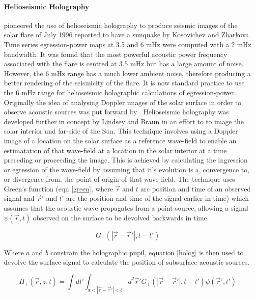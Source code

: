 \paragraph{Helioseismic Holography}\label{helioholog}
\cite{1999ApJ...513L.143D} pioneered the use of helioseismic holography to produce seismic images of the solar flare of July 1996 reported to have a sunquake by Kosovichev and Zharkova. Time series egression-power maps at 3.5 and 6 mHz were computed with a 2 mHz bandwidth. It was found that the most powerful acoustic power frequency associated with the flare is centred at 3.5 mHz but has a large amount of noise. However, the 6 mHz range has a much lower ambient noise, therefore producing a better rendering of the seismicity of the flare. It is now standard practice to use the 6 mHz range for helioseismic holographic calculations of egression-power. \\
Originally the idea of analysing Doppler images of the solar surface in order to observe acoustic sources was put forward by \cite{1975CRASB.281...93R}. Helioseismic holography was developed further in concept by Lindsey and Braun \citep{1990SoPh..126..101L, 1992ApJ...392..739B, 1997ApJ...485..895L} in an effort to to image the solar interior and far-side of the Sun. This technique involves using a Doppler image of a location on the solar surface as a reference wave-field to enable an estimatation of that wave-field at a location in the solar interior at a time preceding or proceeding the image. This is achieved by calculating the ingression or egression of the wave-field by assuming that it's evolution is a, convergence to, or divergence from, the point of origin of that wave-field. The technique uses Green's function (eqn \ref{green}, where $\vec{r}$ and $t$ are position and time of an observed signal and $\vec{r}'$ and $t$' are the position and time of the signal earlier in time) which assumes that the acoustic wave propagates from a point source, allowing a signal $\psi(\vec{r},t)$ observed on the surface to be devolved backwards in time.

\begin{equation}\label{green}
G_{+}(|\vec{r}-\vec{r}'|,t-t')
\end{equation}

Where $a$ and $b$ constrain the holographic pupil, equation \ref{holog} is then used to devolve the surface signal to calculate the position of subsurface acoustic sources.

\begin{equation}\label{holog}
H_{+}(\vec{r},z,t)= \int dt'  \int_{a<|\vec{r}-\vec{r}'|<b} d^{2}\vec{r}'G_{+}(|\vec{r}-\vec{r}'|,t-t')\psi(\vec{r}',t')
\end{equation}

